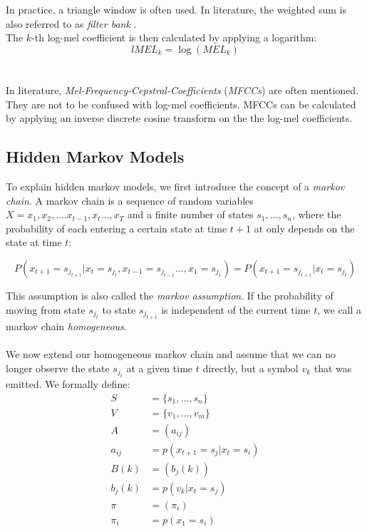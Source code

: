 In practice, a triangle window is often used. In literature, the weighted sum is also referred to as \textit{filter bank} \cite{zhan1997vocal}. \\
The $k$-th log-mel coefficient is then calculated by applying a logarithm:
\[
lMEL_k = \log(MEL_k) 
\]
\\ \\
In literature, \textit{Mel-Frequency-Cepstral-Coefficients} (\textit{MFCCs}) are often mentioned. They are not to be confused with log-mel coefficients. MFCCs can be calculated by applying an inverse discrete cosine transform on the the log-mel coefficients.


\subsection{Hidden Markov Models}
To explain hidden markov models, we first introduce the concept of a \textit{markov chain}. A markov chain is a sequence of random variables $X = x_1, x_2, \dots. x_{t - 1}, x_{t} \dots, x_T$ and a finite number of states $s_1, \dots, s_n$, where the probability of each entering a certain state at time $t + 1$ at only depends on the state at time $t$:

\[
P(x_{t + 1} = s_{j_{t + 1}} | x_{t} = s_{j_t}, x_{t - 1} = s_{j_{t - 1}} \dots, x_{1} = s_{j_{1}}) = P(x_{t + 1} = s_{j_{t + 1}} | x_{t} = s_{j_t})
\] 

This assumption is also called the \textit{markov assumption}. If the probability of moving from state $s_{j_t}$ to state $s_{j_{t + 1}}$ is independent of the current time $t$, we call a markov chain \textit{homogeneous}. \\ \\
We now extend our homogeneous markov chain and assume that we can no longer observe the state $s_{j_t}$ at a given time $t$ directly, but a symbol $v_k$ that was emitted. We formally define: 
\begin{align*}
S &= \{s_1, \dots, s_n\} \tag{states} \\
V &= \{v_1, \dots, v_m\} \tag{symbols} \\
A &= (a_{ij}) \tag{state tansmission probability} \\
a_{ij} &= p(x_{t+1} = s_j | x_{t} = s_i) \\
B(k) &= (b_j(k)) \tag{emisson probability} \\
b_j(k) &= p(v_k | x_t = s_j) \\
\pi &= (\pi_i) \tag{initial state probability} \\
\pi_i &= p(x_1 = s_i)
\end{align*}

